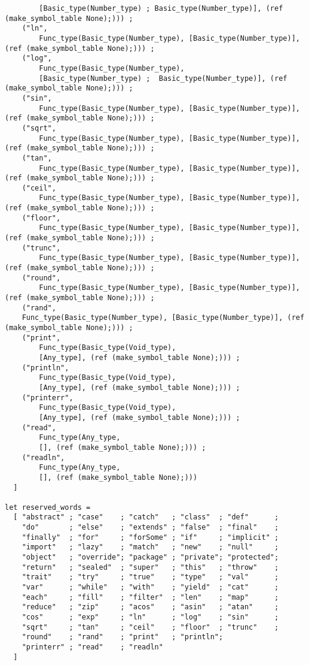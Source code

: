 \begin{verbatim}
        [Basic_type(Number_type) ; Basic_type(Number_type)], (ref (make_symbol_table None);))) ;
    ("ln",
        Func_type(Basic_type(Number_type), [Basic_type(Number_type)], (ref (make_symbol_table None);))) ;
    ("log",
        Func_type(Basic_type(Number_type), 
        [Basic_type(Number_type) ;  Basic_type(Number_type)], (ref (make_symbol_table None);))) ;
    ("sin",
        Func_type(Basic_type(Number_type), [Basic_type(Number_type)], (ref (make_symbol_table None);))) ;
    ("sqrt",
        Func_type(Basic_type(Number_type), [Basic_type(Number_type)], (ref (make_symbol_table None);))) ;
    ("tan",
        Func_type(Basic_type(Number_type), [Basic_type(Number_type)], (ref (make_symbol_table None);))) ;
    ("ceil",
        Func_type(Basic_type(Number_type), [Basic_type(Number_type)], (ref (make_symbol_table None);))) ;
    ("floor",
        Func_type(Basic_type(Number_type), [Basic_type(Number_type)], (ref (make_symbol_table None);))) ;
    ("trunc",
        Func_type(Basic_type(Number_type), [Basic_type(Number_type)], (ref (make_symbol_table None);))) ;
    ("round",
        Func_type(Basic_type(Number_type), [Basic_type(Number_type)], (ref (make_symbol_table None);))) ;
    ("rand",
    Func_type(Basic_type(Number_type), [Basic_type(Number_type)], (ref (make_symbol_table None);))) ;
    ("print",
        Func_type(Basic_type(Void_type),
        [Any_type], (ref (make_symbol_table None);))) ;
    ("println",
        Func_type(Basic_type(Void_type),
        [Any_type], (ref (make_symbol_table None);))) ;
    ("printerr",
        Func_type(Basic_type(Void_type),
        [Any_type], (ref (make_symbol_table None);))) ;
    ("read",
        Func_type(Any_type,
        [], (ref (make_symbol_table None);))) ;
    ("readln",
        Func_type(Any_type,
        [], (ref (make_symbol_table None);))) 
  ]

let reserved_words = 
  [ "abstract" ; "case"    ; "catch"   ; "class"  ; "def"      ;
    "do"       ; "else"    ; "extends" ; "false"  ; "final"    ;
    "finally"  ; "for"     ; "forSome" ; "if"     ; "implicit" ;
    "import"   ; "lazy"    ; "match"   ; "new"    ; "null"     ;
    "object"   ; "override"; "package" ; "private"; "protected";
    "return"   ; "sealed"  ; "super"   ; "this"   ; "throw"    ;
    "trait"    ; "try"     ; "true"    ; "type"   ; "val"      ; 
    "var"      ; "while"   ; "with"    ; "yield"  ; "cat"      ;
    "each"     ; "fill"    ; "filter"  ; "len"    ; "map"      ;
    "reduce"   ; "zip"     ; "acos"    ; "asin"   ; "atan"     ;
    "cos"      ; "exp"     ; "ln"      ; "log"    ; "sin"      ;
    "sqrt"     ; "tan"     ; "ceil"    ; "floor"  ; "trunc"    ;
    "round"    ; "rand"    ; "print"   ; "println";
    "printerr" ; "read"    ; "readln"
  ]


\end{verbatim}
